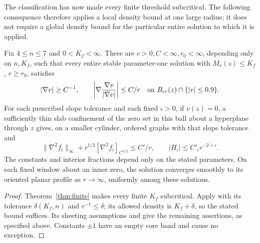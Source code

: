 The classification has now made every finite threshold subcritical.
The following consequence therefore applies a local density bound at
one large radius; it does not require a global density bound for the
particular entire solution to which it is applied.

\begin{corollary}
\label{cor:finite-subcritical}
Fix \(4\le n\le7\) and \(0<K_f<\infty\).
There are \(c>0,C<\infty,r_0<\infty\), depending only on \(n,K_f\),
such that every entire stable parameter-one solution with
\(M_r(z)\le K_f\), \(r\ge r_0\), satisfies
\[
 |\nabla v|\ge C^{-1},\qquad
 \left|\nabla\frac{\nabla v}{|\nabla v|}\right|\le C/r
 \quad\hbox{on }B_{cr}(z)\cap\{|v|\le0.9\}.
\]
For each prescribed slope tolerance and each fixed \(\iota>0\),
if \(v(z)=0\), a sufficiently thin slab confinement of the zero set in
this ball about a hyperplane through \(z\) gives, on a smaller cylinder, ordered graphs with that
slope tolerance and
\[
 \|\nabla^2 f_i\|_\infty+
 r^{1/2}[\nabla^2 f_i]_{C^{1/2}}\le C'/r,\qquad
 |H_i|\le C'_\iota r^{-2+\iota}.
\]
The constants and interior fractions depend only on the stated
parameters.  On each fixed window about an inner zero, the solution
converges smoothly to its oriented planar profile as \(r\to\infty\),
uniformly among these solutions.
\end{corollary}

\begin{proof}
Theorem~\ref{thm:finite} makes every finite \(K_f\) subcritical.
Apply \cite[Theorem~3.2]{FSS2025} with its tolerance \(\delta(K_f,n)\)
and \(r^{-1}\le\delta\); its allowed density is \(K_f+\delta\),
so the stated bound suffices.  Its sheeting assumptions and
\cite[Theorem~2.14, Theorem~4.8, and Lemmas~4.9--4.10]{FSS2025}
give the remaining assertions, as specified above.  Constants
\(\pm1\) have an empty core band and cause no exception.
\end{proof}
